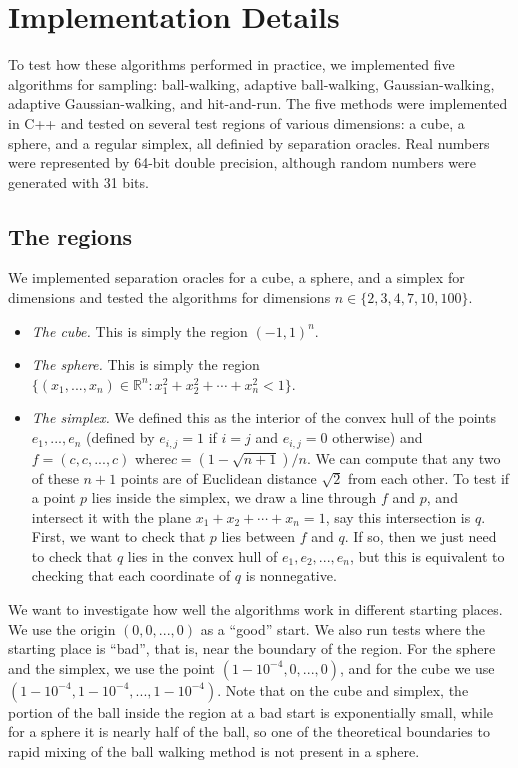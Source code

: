 \documentclass[11pt]{article}
\begin{document}
\section{Implementation Details}

To test how these algorithms performed in practice, we implemented five algorithms for sampling: ball-walking, adaptive ball-walking, Gaussian-walking, adaptive Gaussian-walking, and hit-and-run. The five methods were implemented in C++ and tested on several test regions of various dimensions: a cube, a sphere, and a regular simplex, all definied by separation oracles. Real numbers were represented by 64-bit double precision, although random numbers were generated with 31 bits.

\subsection{The regions}

We implemented separation oracles for a cube, a sphere, and a simplex for dimensions and tested the algorithms for dimensions $n\in\{2,3,4,7,10,100\}$.
\begin{itemize}
\item \emph{The cube.} This is simply the region $(-1,1)^n$.
\item \emph{The sphere.} This is simply the region $\{(x_1,...,x_n)\in\mathbb{R}^n : x_1^2 + x_2^2 + \cdots + x_n^2 < 1\}$.
\item \emph{The simplex.} We defined this as the interior of the convex hull of the points $e_1, ..., e_n$ (defined by $e_{i,j} = 1$ if $i=j$ and $e_{i,j} = 0$ otherwise) and $f = (c,c,...,c)$ where\linebreak $c = (1 - \sqrt{n + 1}) / n$. We can compute that any two of these $n+1$ points are of Euclidean distance $\sqrt{2}$ from each other. To test if a point $p$ lies inside the simplex, we draw a line through $f$ and $p$, and intersect it with the plane $x_1 + x_2 + \cdots + x_n = 1$, say this intersection is $q$. First, we want to check that $p$ lies between $f$ and $q$. If so, then we just need to check that $q$ lies in the convex hull of $e_1,e_2,...,e_n$, but this is equivalent to checking that each coordinate of $q$ is nonnegative.
\end{itemize}

We want to investigate how well the algorithms work in different starting places. We use the origin $(0,0,...,0)$ as a ``good'' start. We also run tests where the starting place is ``bad'', that is, near the boundary of the region. For the sphere and the simplex, we use the point $(1 - 10^{-4}, 0, ..., 0)$, and for the cube we use $(1 - 10^{-4}, 1 - 10^{-4}, ..., 1 - 10^{-4})$. Note that on the cube and simplex, the portion of the ball inside the region at a bad start is exponentially small, while for a sphere it is nearly half of the ball, so one of the theoretical boundaries to rapid mixing of the ball walking method is not present in a sphere.
\end{document}
